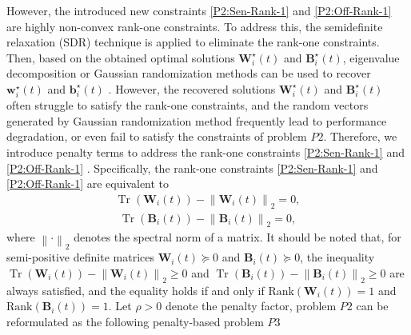 \documentclass[10pt,journal,compsoc]{IEEEtran}
\begin{document}
However, the introduced new constraints \eqref{P2:Sen-Rank-1} and \eqref{P2:Off-Rank-1} are highly non-convex rank-one constraints. 
To address this, the semidefinite relaxation (SDR) technique is applied to eliminate the rank-one constraints. Then, based on the obtained optimal solutions $\mathbf{W}^{\star}_{i}(t)$ and $\mathbf{B}^{\star}_{i}(t)$, 
eigenvalue decomposition or Gaussian randomization methods can be used to recover $\bm{w}^{\star}_{i}(t)$ and $\bm{b}^{\star}_{i}(t)$ \cite{Related works:ISAC:JSAC:Robust-Covert-ISAC}. 
However, the recovered solutions $\mathbf{W}^{\star}_{i}(t)$ and $\mathbf{B}^{\star}_{i}(t)$ often struggle to satisfy the rank-one constraints, and the random vectors generated by Gaussian randomization method frequently lead to performance degradation, or even fail to satisfy the constraints of problem $P2$.
Therefore, we introduce penalty terms to address the rank-one constraints \eqref{P2:Sen-Rank-1} and \eqref{P2:Off-Rank-1} \cite{Solution: Rank-One-Penalty-1, Solution: Rank-One-Penalty-2}. 
Specifically, the rank-one constraints \eqref{P2:Sen-Rank-1} and \eqref{P2:Off-Rank-1} are equivalent to
\begin{align}\label{tempP2:Penalty-1}
    \operatorname{Tr}\left(\mathbf{W}_{i}(t)\right) - \left\|\mathbf{W}_{i}(t)\right\|_{2} = 0, 
\end{align}
\begin{align}\label{tempP2:Penalty-2}
    \operatorname{Tr}\left(\mathbf{B}_{i}(t)\right) - \left\|\mathbf{B}_{i}(t)\right\|_{2}  = 0,
\end{align}
where $\left\|\cdot\right\|_{2}$ denotes the spectral norm of a matrix. 
It should be noted that, for semi-positive definite matrices $\mathbf{W}_{i}(t) \succeq 0$ and $\mathbf{B}_{i}(t) \succeq 0$, the inequality $\operatorname{Tr}\left(\mathbf{W}_{i}(t)\right) - \left\|\mathbf{W}_{i}(t)\right\|_ {2} \ge 0$ and $\operatorname{Tr}\left(\mathbf{B}_{i}(t)\right) - \left\|\mathbf{B}_{i}(t)\right\|_ {2} \ge 0$ are always satisfied, and the equality holds if and only if $\text{Rank}\left(\mathbf{W}_{i}(t)\right) = 1$ and $\text{Rank}\left(\mathbf{B}_{i}(t)\right) = 1$.
Let $\rho > 0$ denote the penalty factor, problem $P2$ can be reformulated as the following penalty-based problem $P3$
\end{document}
